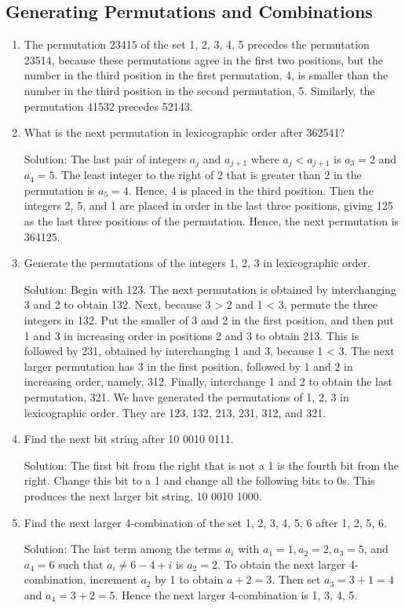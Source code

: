 \documentclass[11pt,a4paper]{book}
\begin{document}
\subsection{Generating Permutations and Combinations}
\begin{enumerate}[label=Example~\arabic*]
\item The permutation 23415 of the set {1, 2, 3, 4, 5} precedes the permutation 23514, because these permutations agree in the first two positions, but the number in the third position in the first permutation, 4, is smaller than the number in the third position in the second permutation, 5.
Similarly, the permutation 41532 precedes 52143.

\item What is the next permutation in lexicographic order after 362541?

Solution: The last pair of integers $a_j$ and $a_{j+1}$ where $a_j < a_{j+1}$ is $a_3 = 2$ and $a_4 = 5$.
The least integer to the right of 2 that is greater than 2 in the permutation is $a_5 = 4$.
Hence, 4 is placed in the third position.
Then the integers 2, 5, and 1 are placed in order in the last three positions, giving 125 as the last three positions of the permutation. Hence, the next permutation is 364125.

\item Generate the permutations of the integers 1, 2, 3 in lexicographic order.

Solution: Begin with 123.
The next permutation is obtained by interchanging 3 and 2 to obtain 132.
Next, because 3 > 2 and 1 < 3, permute the three integers in 132.
Put the smaller of 3 and 2 in the first position, and then put 1 and 3 in increasing order in positions 2 and 3 to obtain 213.
This is followed by 231, obtained by interchanging 1 and 3, because 1 < 3.
The next larger permutation has 3 in the first position, followed by 1 and 2 in increasing order, namely, 312.
Finally, interchange 1 and 2 to obtain the last permutation, 321.
We have generated the permutations of 1, 2, 3 in lexicographic order.
They are 123, 132, 213, 231, 312, and 321.

\item Find the next bit string after 10 0010 0111.

Solution: The first bit from the right that is not a 1 is the fourth bit from the right.
Change this bit to a 1 and change all the following bits to 0s.
This produces the next larger bit string, 10 0010 1000.

\item Find the next larger 4-combination of the set {1, 2, 3, 4, 5, 6} after {1, 2, 5, 6}.

Solution: The last term among the terms $a_i$ with $a_1 = 1, a_2 = 2, a_3 = 5$, and $a_4 = 6$ such that $a_i \neq 6 - 4 + i$ is $a_2 = 2$.
To obtain the next larger 4-combination, increment $a_2$ by 1 to obtain $a+2 = 3$.
Then set $a_3 = 3 + 1 = 4$ and $a_4 = 3 + 2 = 5$.
Hence the next larger 4-combination is {1, 3, 4, 5}.
\end{enumerate}
\end{document}

